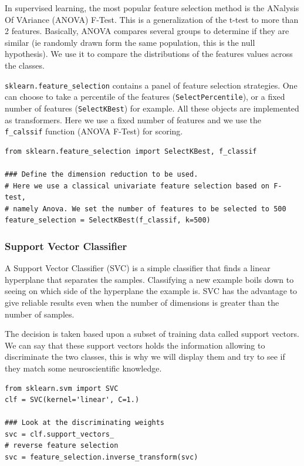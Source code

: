 \documentclass{frontiersSCNS} %
\begin{document}
In supervised learning, the most popular feature selection method is the
ANalysis Of VAriance (ANOVA) F-Test. This is a generalization of the t-test to
more than 2 features. Basically, ANOVA compares several
groups to determine if they are similar (ie randomly drawn form the same
population, this is the null hypothesis). We use it to compare the distributions
of the features values across the classes.

\verb!sklearn.feature_selection! contains a panel of feature selection
strategies. One can choose to take a percentile of the features
(\verb!SelectPercentile!), or a fixed number of features (\verb!SelectKBest!)
for example. All these objects are implemented as transformers.
Here we use a fixed number of features and we use the \verb!f_calssif! function
(ANOVA F-Test) for scoring.

\begin{lstlisting}
from sklearn.feature_selection import SelectKBest, f_classif

### Define the dimension reduction to be used.
# Here we use a classical univariate feature selection based on F-test,
# namely Anova. We set the number of features to be selected to 500
feature_selection = SelectKBest(f_classif, k=500)
\end{lstlisting}

\subsubsection{Support Vector Classifier}

A Support Vector Classifier (SVC) is a simple classifier that finds a linear
hyperplane that separates the samples. Classifying a new example boils down to
seeing on which side of the hyperplane the example is. SVC has the advantage to
give reliable results even when the number of dimensions is greater than the
number of samples.

The decision is taken based upon a subset of training data called support
vectors. We can say that these support vectors holds the information allowing to
discriminate the two classes, this is why we will display them and try to see if
they match some neuroscientific knowledge.

\begin{lstlisting}
from sklearn.svm import SVC
clf = SVC(kernel='linear', C=1.)

### Look at the discriminating weights
svc = clf.support_vectors_
# reverse feature selection
svc = feature_selection.inverse_transform(svc)
\end{lstlisting}
\end{document}
